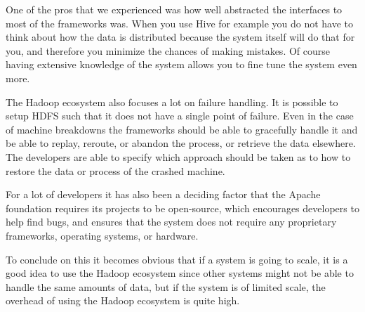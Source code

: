 \newpar One of the pros that we experienced was how well abstracted the interfaces to most of the frameworks was. When you use Hive for example you do not have to think about how the data is distributed because the system itself will do that for you, and therefore you minimize the chances of making mistakes. Of course having extensive knowledge of the system allows you to fine tune the system even more.

\newpar The Hadoop ecosystem also focuses a lot on failure handling. It is possible to setup HDFS such that it does not have a single point of failure. Even in the case of machine breakdowns the frameworks should be able to gracefully handle it and be able to replay, reroute, or abandon the process, or retrieve the data elsewhere. The developers are able to specify which approach should be taken as to how to restore the data or process of the crashed machine.

\newpar For a lot of developers it has also been a deciding factor that the Apache foundation requires its projects to be open-source, which encourages developers to help find bugs, and ensures that the system does not require any proprietary frameworks, operating systems, or hardware.

\newpar To conclude on this it becomes obvious that if a system is going to scale, it is a good idea to use the Hadoop ecosystem since other systems might not be able to handle the same amounts of data, but if the system is of limited scale, the overhead of using the Hadoop ecosystem is quite high.
